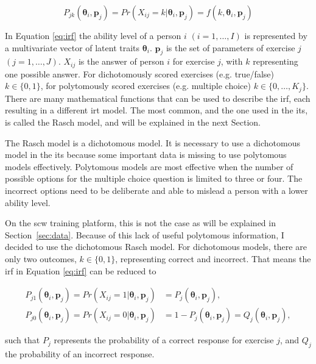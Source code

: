\begin{equation}
    \label{eq:irf}
    P_{jk}(\bm{\theta}_i,\bm{p}_j) = Pr(X_{ij} = k | \bm{\theta}_i,\bm{p}_j) = f(k,\bm{\theta}_i,\bm{p}_j)
\end{equation}

In Equation \ref{eq:irf} the ability level of a person $i$ $(i = 1,\dots,I)$ is represented by a multivariate vector of latent traits $\bm{\theta}_i$. $\bm{p}_j$ is the set of parameters of exercise $j$ $(j = 1,\dots,J)$. $X_{ij}$ is the answer of person $i$ for exercise $j$, with $k$ representing one possible answer. 
For dichotomously scored exercises (e.g. true/false) $k \in \{0,1\}$, for polytomously scored exercises (e.g. multiple choice) $k \in \{0,\dots,K_j\}$. 
There are many mathematical functions that can be used to describe the \gls{irf}, each resulting in a different \gls{irt} model.
The most common, and the one used in the \gls{its}, is called the Rasch model, and will be explained in the next Section.

The Rasch model is a dichotomous model.
It is necessary to use a dichotomous model in the \gls{its} because some important data is missing to use polytomous models effectively.
Polytomous models are most effective when the number of possible options for the multiple choice question is limited to three or four. 
The incorrect options need to be deliberate and able to mislead a person with a lower ability level. 

On the \gls{scw} training platform, this is not the case as will be explained in Section~\ref{sec:data}.
Because of this lack of useful polytomous information, I decided to use the dichotomous Rasch model.
For dichotomous models, there are only two outcomes, $k \in \{0,1\}$, representing correct and incorrect.
That means the \gls{irf} in Equation \ref{eq:irf} can be reduced to

\begin{subequations}
\label{eq:irf-dicho}
\begin{align}
        P_{j1}(\bm{\theta}_i,\bm{p}_j) = Pr(X_{ij} = 1 | \bm{\theta}_i,\bm{p}_j) &= P_{j}(\bm{\theta}_i,\bm{p}_j) ,         \label{eq:irf-dicho1} \\
        P_{j0}(\bm{\theta}_i,\bm{p}_j) = Pr(X_{ij} = 0 | \bm{\theta}_i,\bm{p}_j)
        &= 1 - P_{j}(\bm{\theta}_i,\bm{p}_j)
        = Q_{j}(\bm{\theta}_i,\bm{p}_j) ,         \label{eq:irf-dicho2}
\end{align}
\end{subequations}

such that $P_{j}$ represents the probability of a correct response for exercise $j$, and $Q_j$ the probability of an incorrect response.

